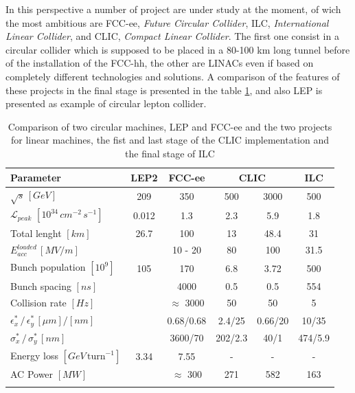 In this perspective a number of project are under study at the moment, of wich the most ambitious are FCC-ee, \textit{Future Circular Collider}, ILC, \textit{International Linear Collider}, and CLIC, \textit{Compact Linear Collider}. The first one consist in a circular collider which is supposed to be placed in a 80-100 km long tunnel before of the installation of the FCC-hh, the other are LINACs even if based on completely different technologies and solutions.  A comparison of the features of these projects in the final stage is presented in the table \ref{table_CLIC_ILC_FCC}, and also LEP is presented as example of circular lepton collider.

\begin{table}
  \centering
    \begin{tabular}{ l c c | c c c }
    \hline
    \hline
    \textbf{Parameter}								& \textbf{LEP2}	&	\textbf{FCC-ee}	&  \multicolumn{2}{c}{\textbf{CLIC}}	&	\textbf{ILC}	\\
    \hline
    $\sqrt{s} \, [GeV]$								& 209	& 350  			&  	500	&  3000	& 500	\\
    $\mathscr{L}_{peak}$  $[10^{34} \, cm^{-2} \, s^{-1}]$	&0.012	& 1.3				&  	2.3	& 	5.9	&1.8		\\
    Total lenght $[km]$							&26.7	& 100			& 13		&  48.4	& 31		\\
    $E_{acc}^{loaded} \, [MV/m]$					&		& 10 - 20			& 80		& 100 	& 31.5	\\
    Bunch population $[10^9]$						& 105	& 170  			&  6.8	& 	3.72	& 500	\\
    Bunch spacing $[ns]$							& 		& 4000	  		&  	0.5	& 	0.5	& 554	\\
    Collision rate $[Hz]$							&  		&$\approx$ 3000	&  	50	& 	50	& 5		\\
    $\epsilon^*_x \, / \, \epsilon^*_y \, [\mu m]/[nm]$		& 		&  	0.68/0.68	        		&  2.4/25	& 0.66/20	& 10/35	\\  
    $\sigma^*_x\, / \, \sigma^*_y\, [nm]$				& 		&  	3600/70		&  202/2.3	& 40/1	&474/5.9	\\    
    Energy loss $[GeV\,\text{turn}^{-1}]$						&  3.34	& 	7.55			& - 		& -		& -		\\
    AC Power $[MW]$						&  		& $\approx$ 300		& 271	& 582	& 163	\\
    \hline
    \hline
    \label{CLIC_param_table}
    \end{tabular}
  \caption{Comparison of two circular machines, LEP\cite{FCC-ee:leptonCollParam} and FCC-ee\cite{FCC-ee:leptonCollParam,Zimmermann:2057706} and the two projects for linear machines, the fist and last stage of the CLIC implementation \cite{CLIC:cdr} and the final stage of ILC\cite{ILC:tdr} }\label{table_CLIC_ILC_FCC}
\end{table}



